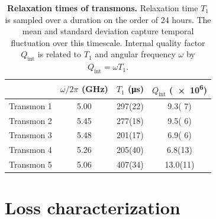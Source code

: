 \documentclass[
    reprint,
    superscriptaddress,
    amsmath,amssymb,
    aps,
    prb,
    floatfix,
]{revtex4-2}
\begin{document}
\begin{table}[h]
    \begin{ruledtabular}
    \begin{tabular}{
        c
        S[table-format=1.2]
        S[table-format=3(2)]
        S[table-format=2.1(1.1)]
    }
         & {$\omega/2\pi$ (\si{\giga\hertz})} & {$T_1$ (\si{\micro\second})} & {$Q_\mathrm{int}$ (\num{e6})} \\
         \midrule
         Transmon 1 & 5.00 & 297(22) &  9.3( 7) \\
         Transmon 2 & 5.45 & 277(18) &  9.5( 6) \\
         Transmon 3 & 5.48 & 201(17) &  6.9( 6) \\
         Transmon 4 & 5.26 & 205(40) &  6.8(13) \\
         Transmon 5 & 5.06 & 407(34) & 13.0(11) \\
    \end{tabular}
    \end{ruledtabular}
    \caption{\label{tab:T1} \textbf{Relaxation times of transmons.} Relaxation time $T_1$ is sampled over a duration on the order of 24 hours. The mean and standard deviation capture temporal fluctuation over this timescale. Internal quality factor $Q_\mathrm{int}$ is related to $T_1$ and angular frequency $\omega$ by $Q_\mathrm{int}=\omega T_1$.}
\end{table}

\section{Loss characterization}\label{section:loss}
\end{document}
